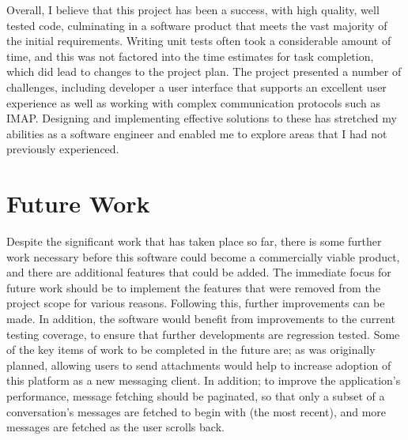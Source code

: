 Overall, I believe that this project has been a success, with high quality, well tested code, culminating in a software product that meets the vast majority of the initial requirements. Writing unit tests often took a considerable amount of time, and this was not factored into the time estimates for task completion, which did lead to changes to the project plan. The project presented a number of challenges, including developer a user interface that supports an excellent user experience as well as working with complex communication protocols such as IMAP. Designing and implementing effective solutions to these has stretched my abilities as a software engineer and enabled me to explore areas that I had not previously experienced.

\section{Future Work}
Despite the significant work that has taken place so far, there is some further work necessary before this software could become a commercially viable product, and there are additional features that could be added. The immediate focus for future work should be to implement the features that were removed from the project scope for various reasons. Following this, further improvements can be made. In addition, the software would benefit from improvements to the current testing coverage, to ensure that further developments are regression tested. Some of the key items of work to be completed in the future are; as was originally planned, allowing users to send attachments would help to increase adoption of this platform as a new messaging client. In addition; to improve the application's performance, message fetching should be paginated, so that only a subset of a conversation's messages are fetched to begin with (the most recent), and more messages are fetched as the user scrolls back.
